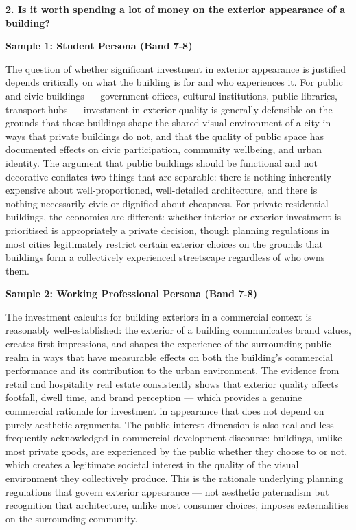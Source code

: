 \separator

\begin{ieltsquestion}
\textbf{2. Is it worth spending a lot of money on the exterior appearance of a building?}
\end{ieltsquestion}
\textbf{Sample 1: Student Persona (Band 7-8)}

The question of whether significant investment in exterior appearance is justified depends critically on what the building is for and who experiences it. For public and civic buildings — government offices, cultural institutions, public libraries, transport hubs — investment in exterior quality is generally defensible on the grounds that these buildings shape the shared visual environment of a city in ways that private buildings do not, and that the quality of public space has documented effects on civic participation, community wellbeing, and urban identity. The argument that public buildings should be functional and not decorative conflates two things that are separable: there is nothing inherently expensive about well-proportioned, well-detailed architecture, and there is nothing necessarily civic or dignified about cheapness. For private residential buildings, the economics are different: whether interior or exterior investment is prioritised is appropriately a private decision, though planning regulations in most cities legitimately restrict certain exterior choices on the grounds that buildings form a collectively experienced streetscape regardless of who owns them.

\textbf{Sample 2: Working Professional Persona (Band 7-8)}

The investment calculus for building exteriors in a commercial context is reasonably well-established: the exterior of a building communicates brand values, creates first impressions, and shapes the experience of the surrounding public realm in ways that have measurable effects on both the building's commercial performance and its contribution to the urban environment. The evidence from retail and hospitality real estate consistently shows that exterior quality affects footfall, dwell time, and brand perception — which provides a genuine commercial rationale for investment in appearance that does not depend on purely aesthetic arguments. The public interest dimension is also real and less frequently acknowledged in commercial development discourse: buildings, unlike most private goods, are experienced by the public whether they choose to or not, which creates a legitimate societal interest in the quality of the visual environment they collectively produce. This is the rationale underlying planning regulations that govern exterior appearance — not aesthetic paternalism but recognition that architecture, unlike most consumer choices, imposes externalities on the surrounding community.

